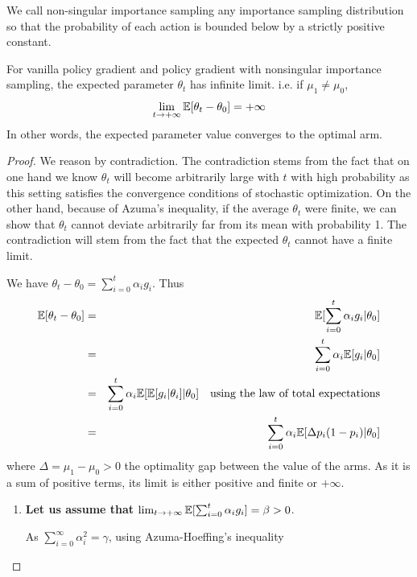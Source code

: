 We call non-singular importance sampling any importance sampling distribution so that the probability of each action is bounded below by a strictly positive constant.
\begin{lemma} For vanilla policy gradient and policy gradient with nonsingular importance sampling, the expected parameter $\theta_t$ has infinite limit.
i.e. if $\mu_1 \neq \mu_0$,
$$\lim_{t \to +\infty} \mathbb{E}[ \theta_t - \theta_0] = +\infty$$
In other words, the expected parameter value converges to the optimal arm.
\end{lemma}
\begin{proof}

We reason by contradiction. The contradiction stems from the fact that on one hand we know $\theta_t$ will become arbitrarily large with $t$ with high probability as this setting satisfies the convergence conditions of stochastic optimization. On the other hand, because of Azuma's inequality, if the average $\theta_t$ were finite, we can show that $\theta_t$ cannot deviate arbitrarily far from its mean with probability 1. The contradiction will stem from the fact that the expected $\theta_t$ cannot have a finite limit.

We have $\theta_t - \theta_0 = \sum_{i=0}^{t} \alpha_i g_i$. Thus
\begin{eqnarray*}
\mathbb{E}[\theta_t - \theta_0 ] &=& \mathbb{E}[\sum_{i=0}^{t} \alpha_i g_i | \theta_0]\\
&=& \sum_{i=0}^{t} \alpha_i \mathbb{E}[ g_i | \theta_0] \\
&=& \sum_{i=0}^{t} \alpha_i \mathbb{E}[ \mathbb{E}[ g_i |\theta_i]| \theta_0]\quad \text{using the law of total expectations}\\
&=& \sum_{i=0}^{t} \alpha_i \mathbb{E}[ \Delta p_i (1-p_i) | \theta_0] 
\end{eqnarray*}
where $\Delta = \mu_1 - \mu_0 > 0$ the optimality gap between the value of the arms. As it is a sum of positive terms, its limit is either positive and finite or $+ \infty$.
\begin{enumerate} 
\item \textbf{Let us assume that $\lim_{t \to +\infty} \mathbb{E}[\sum_{i=0}^{t} \alpha_i g_i] = \beta > 0$}. 

As $\sum_{i=0}^\infty \alpha_i^2 = \gamma$, using 
Azuma-Hoeffing's inequality 



\end{enumerate}
\end{proof}
